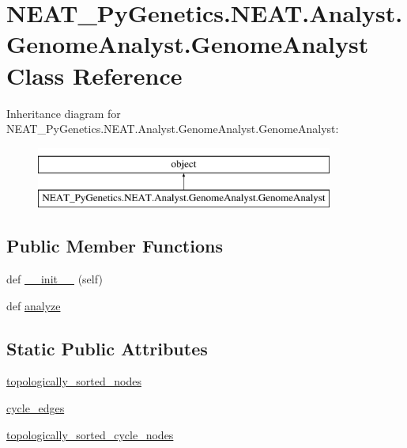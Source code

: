 \hypertarget{classNEAT__PyGenetics_1_1NEAT_1_1Analyst_1_1GenomeAnalyst_1_1GenomeAnalyst}{}\section{N\+E\+A\+T\+\_\+\+Py\+Genetics.\+N\+E\+A\+T.\+Analyst.\+Genome\+Analyst.\+Genome\+Analyst Class Reference}
\label{classNEAT__PyGenetics_1_1NEAT_1_1Analyst_1_1GenomeAnalyst_1_1GenomeAnalyst}
Inheritance diagram for N\+E\+A\+T\+\_\+\+Py\+Genetics.\+N\+E\+A\+T.\+Analyst.\+Genome\+Analyst.\+Genome\+Analyst\+:\begin{figure}[H]
\begin{center}
\leavevmode
\includegraphics[height=2.000000cm]{classNEAT__PyGenetics_1_1NEAT_1_1Analyst_1_1GenomeAnalyst_1_1GenomeAnalyst}
\end{center}
\end{figure}
\subsection*{Public Member Functions}
\begin{DoxyCompactItemize}
\item 
def \hyperlink{classNEAT__PyGenetics_1_1NEAT_1_1Analyst_1_1GenomeAnalyst_1_1GenomeAnalyst_a2b9e3334de517a0555177ee6bcc0ac04}{\+\_\+\+\_\+init\+\_\+\+\_\+} (self)
\item 
def \hyperlink{classNEAT__PyGenetics_1_1NEAT_1_1Analyst_1_1GenomeAnalyst_1_1GenomeAnalyst_afdd3b4e6b0b8275dd62677b8d5a18933}{analyze}
\end{DoxyCompactItemize}
\subsection*{Static Public Attributes}
\begin{DoxyCompactItemize}
\item 
\hyperlink{classNEAT__PyGenetics_1_1NEAT_1_1Analyst_1_1GenomeAnalyst_1_1GenomeAnalyst_a61333814f998f2c80d271f3ebc92d198}{topologically\+\_\+sorted\+\_\+nodes}
\item 
\hyperlink{classNEAT__PyGenetics_1_1NEAT_1_1Analyst_1_1GenomeAnalyst_1_1GenomeAnalyst_a5453383e771c7f655739ee80508a8b08}{cycle\+\_\+edges}
\item 
\hyperlink{classNEAT__PyGenetics_1_1NEAT_1_1Analyst_1_1GenomeAnalyst_1_1GenomeAnalyst_adee62c855c0445f8b5c4032ceaf1217d}{topologically\+\_\+sorted\+\_\+cycle\+\_\+nodes}
\end{DoxyCompactItemize}


